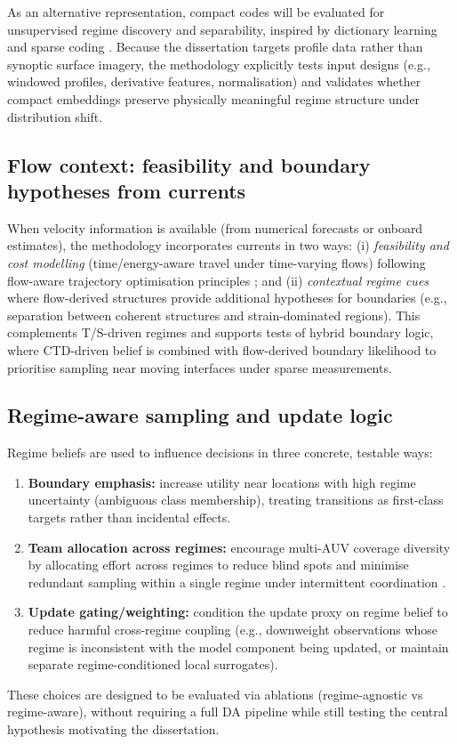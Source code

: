 As an alternative representation, compact codes will be evaluated for unsupervised regime discovery and separability, inspired by dictionary learning
and sparse coding \parencite{fossum2020compact}. Because the dissertation targets profile data rather than synoptic surface imagery, the methodology
explicitly tests input designs (e.g., windowed profiles, derivative features, normalisation) and validates whether compact embeddings preserve physically
meaningful regime structure under distribution shift.

\subsection{Flow context: feasibility and boundary hypotheses from currents}
When velocity information is available (from numerical forecasts or onboard estimates), the methodology incorporates currents in two ways:
(i) \emph{feasibility and cost modelling} (time/energy-aware travel under time-varying flows) following flow-aware trajectory optimisation principles
\parencite{aguiar2018trajectoryopt}; and (ii) \emph{contextual regime cues} where flow-derived structures provide additional hypotheses for boundaries
(e.g., separation between coherent structures and strain-dominated regions). This complements T/S-driven regimes and supports tests of hybrid boundary
logic, where CTD-driven belief is combined with flow-derived boundary likelihood to prioritise sampling near moving interfaces under sparse measurements.

\subsection{Regime-aware sampling and update logic}
Regime beliefs are used to influence decisions in three concrete, testable ways:
\begin{enumerate}
  \item \textbf{Boundary emphasis:} increase utility near locations with high regime uncertainty (ambiguous class membership), treating transitions as
  first-class targets rather than incidental effects.
  \item \textbf{Team allocation across regimes:} encourage multi-AUV coverage diversity by allocating effort across regimes to reduce blind spots and
  minimise redundant sampling within a single regime under intermittent coordination \parencite{hwang2019auvreview,dalfabbro2025douroplume}.
  \item \textbf{Update gating/weighting:} condition the update proxy on regime belief to reduce harmful cross-regime coupling (e.g., downweight observations
  whose regime is inconsistent with the model component being updated, or maintain separate regime-conditioned local surrogates).
\end{enumerate}
These choices are designed to be evaluated via ablations (regime-agnostic vs regime-aware), without requiring a full DA pipeline while still testing the
central hypothesis motivating the dissertation.

